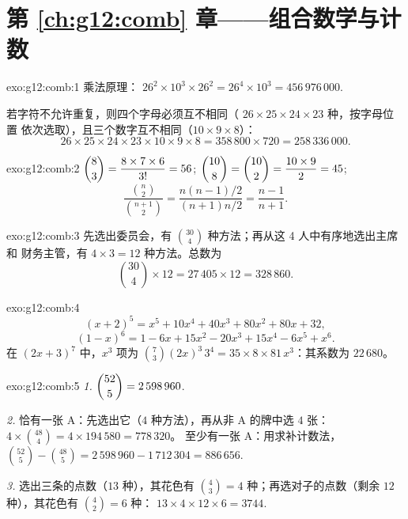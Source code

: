 \section*{第 \ref{ch:g12:comb} 章——组合数学与计数}

\begin{solution}{exo:g12:comb:1}
乘法原理：
$26^2 \times 10^3 \times 26^2 = 26^4 \times 10^3 = 456\,976\,000$.

若字符不允许重复，则四个字母必须互不相同（
$26 \times 25 \times 24 \times 23$ 种，按字母位置
依次选取），且三个数字互不相同（$10 \times 9 \times 8$）：
\[
26 \times 25 \times 24 \times 23 \times 10 \times 9 \times 8
= 358\,800 \times 720 = 258\,336\,000 .
\]
\end{solution}

\begin{solution}{exo:g12:comb:2}
$\dbinom83 = \dfrac{8 \times 7 \times 6}{3!} = 56$;
$\dbinom{10}{8} = \dbinom{10}{2} = \dfrac{10 \times 9}{2} = 45$;
\[
\frac{\binom n2}{\binom{n+1}2}
= \frac{n(n-1)/2}{(n+1)n/2} = \frac{n-1}{n+1}.
\]
\end{solution}

\begin{solution}{exo:g12:comb:3}
先选出委员会，有 $\binom{30}{4}$ 种方法；再从这 4 人中有序地选出主席和
财务主管，有 $4 \times 3 = 12$ 种方法。总数为
\[
\binom{30}{4} \times 12 = 27\,405 \times 12 = 328\,860 .
\]
\end{solution}

\begin{solution}{exo:g12:comb:4}
\[
(x+2)^5 = x^5 + 10x^4 + 40x^3 + 80x^2 + 80x + 32 ,
\]
\[
(1-x)^6 = 1 - 6x + 15x^2 - 20x^3 + 15x^4 - 6x^5 + x^6 .
\]
在 $(2x+3)^7$ 中，$x^3$ 项为
$\binom{7}{3}(2x)^3\,3^4 = 35 \times 8 \times 81\, x^3$：其系数为
$22\,680$。
\end{solution}

\begin{solution}{exo:g12:comb:5}
\emph{1.} $\dbinom{52}{5} = 2\,598\,960$.

\emph{2.} 恰有一张 A：先选出它（$4$ 种方法），再从非 A 的牌中选 $4$
张：$4 \times \binom{48}{4} = 4 \times 194\,580 = 778\,320$。
至少有一张 A：用求补计数法，
$\binom{52}{5} - \binom{48}{5} = 2\,598\,960 - 1\,712\,304 = 886\,656$.

\emph{3.} 选出三条的点数（$13$ 种），其花色有
$\binom43 = 4$ 种；再选对子的点数（剩余 $12$ 种），其花色有
$\binom42 = 6$ 种：
$13 \times 4 \times 12 \times 6 = 3744$.
\end{solution}

